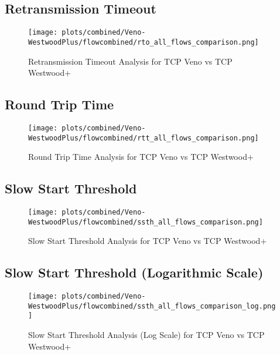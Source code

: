 \documentclass[12pt,a4paper]{report}
\begin{document}
\newpage

\newpage
\subsection{Retransmission Timeout}
\begin{figure}[H]
\centering
\texttt{[image: plots/combined/Veno-WestwoodPlus/flowcombined/rto\_all\_flows\_comparison.png]}
\caption{Retransmission Timeout Analysis for TCP Veno vs TCP Westwood+}
\label{fig:Veno-WestwoodPlus_rto}
\end{figure}

\newpage

\newpage
\subsection{Round Trip Time}
\begin{figure}[H]
\centering
\texttt{[image: plots/combined/Veno-WestwoodPlus/flowcombined/rtt\_all\_flows\_comparison.png]}
\caption{Round Trip Time Analysis for TCP Veno vs TCP Westwood+}
\label{fig:Veno-WestwoodPlus_rtt}
\end{figure}

\newpage

\newpage
\subsection{Slow Start Threshold}
\begin{figure}[H]
\centering
\texttt{[image: plots/combined/Veno-WestwoodPlus/flowcombined/ssth\_all\_flows\_comparison.png]}
\caption{Slow Start Threshold Analysis for TCP Veno vs TCP Westwood+}
\label{fig:Veno-WestwoodPlus_ssth}
\end{figure}

\newpage

\subsection{Slow Start Threshold (Logarithmic Scale)}
\begin{figure}[H]
\centering
\texttt{[image: plots/combined/Veno-WestwoodPlus/flowcombined/ssth\_all\_flows\_comparison\_log.png]}
\caption{Slow Start Threshold Analysis (Log Scale) for TCP Veno vs TCP Westwood+}
\label{fig:Veno-WestwoodPlus_ssth_log}
\end{figure}

\newpage
\end{document}
